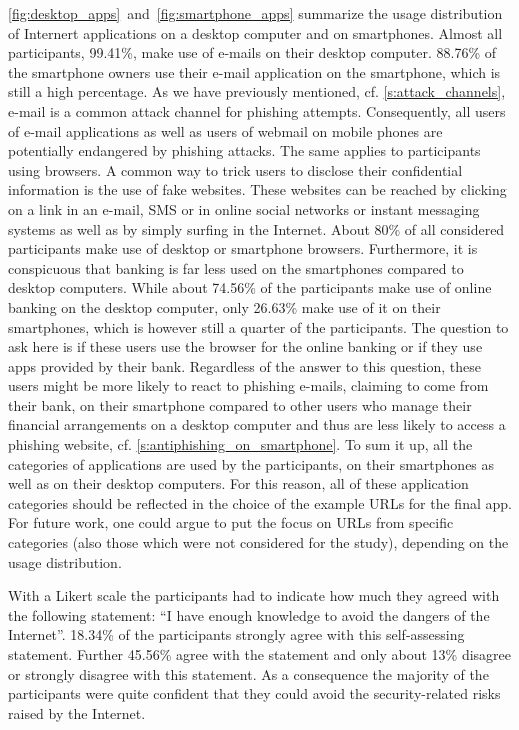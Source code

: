 \begin{description}[leftmargin=0cm]
	
	\item[Usage Distribution of Internet Applications] \autoref{fig:desktop_apps}~and~\autoref{fig:smartphone_apps} summarize the usage distribution of Internert applications on a desktop computer and on smartphones.
 Almost all participants, 99.41\%, make use of e-mails on their desktop computer.
 88.76\% of the smartphone owners use their e-mail application on the smartphone, which is still a high percentage.
 As we have previously mentioned, cf. \autoref{s:attack_channels}, e-mail is a common attack channel for phishing attempts.
 Consequently, all users of e-mail applications as well as users of webmail on mobile phones are potentially endangered by phishing attacks.
 The same applies to participants using browsers.
 A common way to trick users to disclose their confidential information is the use of fake websites.
 These websites can be reached by clicking on a link in an e-mail, SMS or in online social networks or instant messaging systems as well as by simply surfing in the Internet.
 About 80\% of all considered participants make use of desktop or smartphone browsers.
 Furthermore, it is conspicuous that banking is far less used on the smartphones compared to desktop computers.
 While about 74.56\% of the participants make use of online banking on the desktop computer, only 26.63\% make use of it on their smartphones, which is however still a quarter of the participants.
	The question to ask here is if these users use the browser for the online banking or if they use apps provided by their bank.
 Regardless of the answer to this question, these users might be more likely to react to phishing e-mails, claiming to come from their bank, on their smartphone compared to other users who manage their financial arrangements on a desktop computer and thus are less likely to access a phishing website, cf. \autoref{s:antiphishing_on_smartphone}. To sum it up, all the categories of applications are used by the participants, on their smartphones as well as on their desktop computers.
 For this reason, all of these application categories should be reflected in the choice of the example URLs for the final app.
 For future work, one could argue to put the focus on URLs from specific categories (also those which were not considered for the study), depending on the usage distribution.


	\item[Self-Assessment - Knowledge to avoid dangers of Internet] With a Likert scale the participants had to indicate how much they agreed with the following statement: ``I have enough knowledge to avoid the dangers of the Internet''. 18.34\% of the participants strongly agree with this self-assessing statement.
 Further 45.56\% agree with the statement and only about 13\% disagree or strongly disagree with this statement.
 As a consequence the majority of the participants were quite confident that they could avoid the security-related risks raised by the Internet.
 

\end{description}
